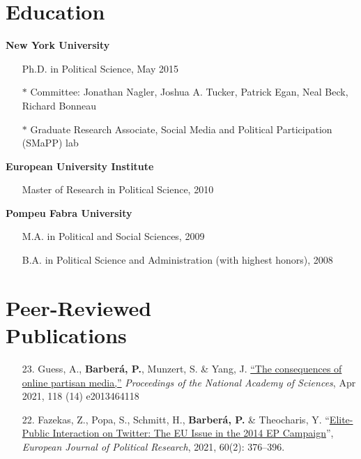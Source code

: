 \documentclass[margin,line,11pt]{resume}
\begin{document}
\begin{resume}
    \section{\mysidestyle Education}
\textbf{New York University}
\begin{itemize}
\item[] Ph.D. in Political Science, May 2015
\vspace{-.15cm}
\item[] $\ast$ Committee: Jonathan Nagler, Joshua A. Tucker, Patrick Egan, Neal Beck, Richard Bonneau
\vspace{-.15cm}
\item[] $\ast$  Graduate Research Associate, Social Media and Political Participation (SMaPP) lab
\end{itemize}
\vspace{-.30cm}
\textbf{European University Institute} 
\begin{itemize}
\item[] Master of Research in Political Science, 2010
\end{itemize}
\vspace{-.30cm}
\textbf{Pompeu Fabra University} 
\begin{itemize}
\item[] M.A. in Political and Social Sciences, 2009
\vspace{-.15cm}
\item[] B.A. in Political Science and Administration (with highest honors), 2008 
\end{itemize}

    \section{\mysidestyle Peer-Reviewed\\Publications}
\vspace{.15cm}    
\begin{itemize}[leftmargin=5.5mm]

\item[23.] Guess, A., \textbf{Barber\'{a}, P.}, Munzert, S. \& Yang, J. \href{https://www.pnas.org/content/118/14/e2013464118}{``The consequences of online partisan media,''} \textit{Proceedings of the National Academy of Sciences}, Apr 2021, 118 (14) e2013464118

\item[22.] 
Fazekas, Z., Popa, S., Schmitt, H., \textbf{Barber\'{a}, P.} \& Theocharis, Y. ``\href{https://ejpr.onlinelibrary.wiley.com/doi/10.1111/1475-6765.12402}{Elite-Public Interaction on Twitter: The EU Issue in the 2014 EP Campaign}'', \textit{European Journal of Political Research}, 2021, 60(2): 376--396.


\end{itemize}
\end{resume}
\end{document}
